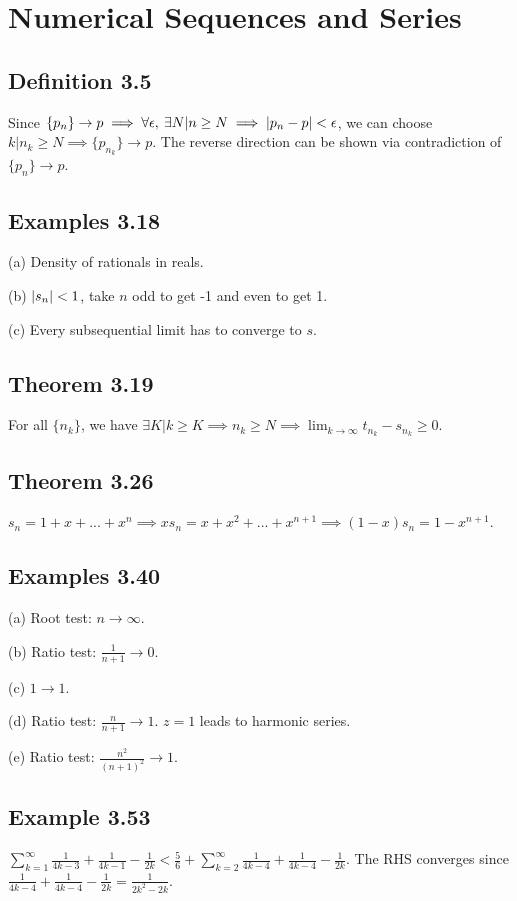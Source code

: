 \section{Numerical Sequences and Series}

\subsection*{Definition 3.5}
Since $\{p_n\} \to p \implies \forall \epsilon, \: \exists N | n \geq N \implies \abs{p_n - p} < \epsilon$,
we can choose $k | n_k \geq N \implies \{p_{n_k}\} \to p$.
The reverse direction can be shown via contradiction of $\{p_n\} \to p$.

\subsection*{Examples 3.18}
(a) Density of rationals in reals.

(b) $\abs{s_n} < 1$, take $n$ odd to get -1 and even to get 1.

(c) Every subsequential limit has to converge to $s$.

\subsection*{Theorem 3.19}
For all $\{n_k\}$, we have $\exists K | k \geq K \implies  n_k \geq N \implies \lim_{k \to \infty} t_{n_k} - s_{n_k} \geq 0$.

\subsection*{Theorem 3.26}
$s_n = 1 + x + ... + x^n \implies x s_n = x + x^2 + ... + x^{n+1} \implies (1 - x) s_n = 1 - x^{n+1}$.

\subsection*{Examples 3.40}
(a) Root test: $n \to \infty$.

(b) Ratio test: $\frac{1}{n+1} \to 0$.

(c) $1 \to 1$.

(d) Ratio test: $\frac{n}{n+1} \to 1$. $z = 1$ leads to harmonic series.

(e) Ratio test: $\frac{n^2}{(n+1)^2} \to 1$.

\subsection*{Example 3.53}
$\sum_{k=1}^{\infty} \frac{1}{4k-3} + \frac{1}{4k-1} - \frac{1}{2k} < \frac{5}{6} + \sum_{k=2}^{\infty} \frac{1}{4k-4} + \frac{1}{4k-4} - \frac{1}{2k}$. The RHS converges since $\frac{1}{4k-4} + \frac{1}{4k-4} - \frac{1}{2k} = \frac{1}{2k^2 - 2k}$.


